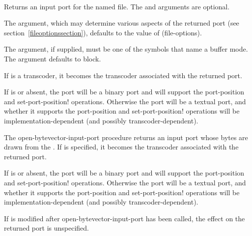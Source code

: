 \begin{entry}{%
\\
}
   

Returns an input port for the named file. The  and
 arguments are optional.

The  argument, which may determine
various aspects of the returned port (see section~\ref{fileoptionssection}),
defaults to the value of {\cf (file-options)}.

The  argument, if supplied,
must be one of the symbols that name a buffer mode.
The  argument defaults to {\cf block}.

If  is a transcoder, it becomes the transcoder associated
with the returned port.

If  is \schfalse{} or absent,
the port will be a binary port and will support the
{\cf port-position} and {\cf set-port-position!}  operations.
Otherwise the port will be a textual port, and whether it supports
the {\cf port-position} and {\cf set-port-position!} operations
will be implementation-dependent (and possibly transcoder-dependent).
\end{entry}

\begin{entry}{%
}

   
The {\cf open-bytevector-input-port} procedure returns an input port whose bytes are drawn from the
.
If  is specified, it becomes the transcoder associated
with the returned port.

If  is \schfalse{} or absent,
the port will be a binary port and will support the
{\cf port-position} and {\cf set-port-position!}  operations.
Otherwise the port will be a textual port, and whether it supports
the {\cf port-position} and {\cf set-port-position!} operations
will be implementation-dependent (and possibly transcoder-dependent).

If  is modified after {\cf open-\linebreak[0]bytevector-\linebreak[0]input-\linebreak[0]port}
has been called, the effect on the returned
port is unspecified.
\end{entry}

